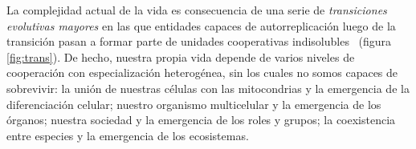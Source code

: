\documentclass[a4paper,11pt]{book}
\theoremstyle{definition}
\begin{document}
La complejidad actual de la vida es consecuencia de una serie de \emph{transiciones evolutivas mayores} en las que entidades capaces de autorreplicación luego de la transición pasan a formar parte de unidades cooperativas indisolubles~\cite{maynardSmith1995-majorTransitions, szathmary1995-evolutionaryTransitions, szathmary2015-evolutionaryTransitions} (figura \ref{fig:trans}).
%
De hecho, nuestra propia vida depende de varios niveles de cooperación con especialización heterogénea, sin los cuales no somos capaces de sobrevivir: la unión de nuestras células con las mitocondrias y la emergencia de la diferenciación celular; nuestro organismo multicelular y la emergencia de los órganos; nuestra sociedad y la emergencia de los roles y grupos; la coexistencia entre especies y la emergencia de los ecosistemas.
%
%
\end{document}
